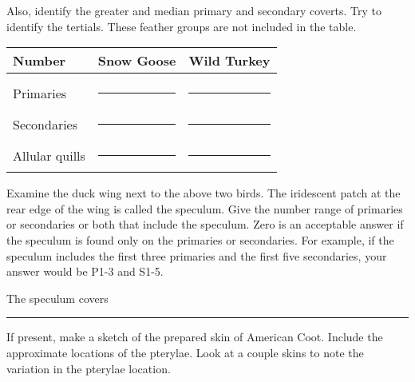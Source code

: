 \documentclass[10pt]{article}
\begin{document}
Also, identify the greater and median primary and secondary coverts.  Try to identify the tertials. These feather groups are not included in the table.

\begin{tabular}{lcc}
	\toprule
	Number	&	Snow Goose	& Wild Turkey \tabularnewline
	\midrule
	&	& \\[0.3in]
	Primaries	& \rule{1in}{0.4pt} & \rule{1in}{0.4pt} \\[0.5in]
	Secondaries & \rule{1in}{0.4pt} & \rule{1in}{0.4pt} \\[0.5in]
	Allular quills & \rule{1in}{0.4pt} & \rule{1in}{0.4pt} \\
	\bottomrule
\end{tabular}

\vspace{2\baselineskip}

Examine the duck wing next to the above two birds. The iridescent patch at the rear edge of the wing is called the speculum.  Give the number range of primaries or secondaries or both that include the speculum.  Zero is an acceptable answer if the speculum is found only on the primaries or secondaries. For example, if the speculum includes the first three primaries and the first five secondaries, your answer would be P1-3 and S1-5.

\vspace{2\baselineskip}

The speculum covers \rule{3in}{0.4pt}

\vspace{2\baselineskip}

If present, make a sketch of the prepared skin of American Coot. Include the approximate locations of the pterylae. Look at a couple skins to note the variation in the pterylae location.
\end{document}

